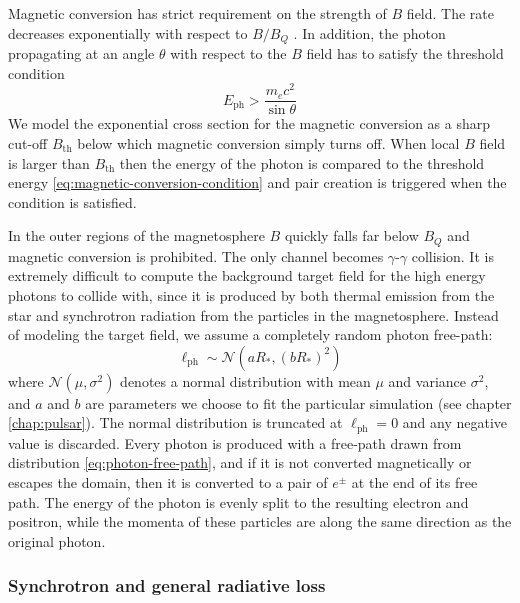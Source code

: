 Magnetic conversion has strict requirement on the strength of $B$ field. The
rate decreases exponentially with respect to $B/B_{Q}$
\citep{erber_high-energy_1966}. In addition, the photon propagating at an angle
$\theta$ with respect to the $B$ field has to satisfy the threshold condition
\begin{equation}
  \label{eq:magnetic-conversion-condition}
  E_\mathrm{ph} > \frac{m_{e}c^2}{\sin\theta}
\end{equation}
We model the exponential cross section for the magnetic conversion as a sharp
cut-off $B_\mathrm{th}$ below which magnetic conversion simply turns off. When
local $B$ field is larger than $B_\mathrm{th}$ then the energy of the photon is
compared to the threshold energy \eqref{eq:magnetic-conversion-condition} and
pair creation is triggered when the condition is satisfied.

In the outer regions of the magnetosphere $B$ quickly falls far below $B_{Q}$
and magnetic conversion is prohibited. The only channel becomes
$\gamma$-$\gamma$ collision. It is extremely difficult to compute the background
target field for the high energy photons to collide with, since it is produced
by both thermal emission from the star and synchrotron radiation from the
particles in the magnetosphere. Instead of modeling the target field, we assume
a completely random photon free-path:
\begin{equation}
  \label{eq:photon-free-path}
  \ell_\mathrm{ph} \sim \mathcal{N}(aR_{*}, (bR_{*})^2)
\end{equation}
where $\mathcal{N}(\mu, \sigma^2)$ denotes a normal distribution with mean $\mu$
and variance $\sigma^2$, and $a$ and $b$ are parameters we choose to fit the
particular simulation (see chapter \ref{chap:pulsar}). The normal distribution
is truncated at $\ell_\mathrm{ph} = 0$ and any negative value is discarded.
Every photon is produced with a free-path drawn from distribution
\ref{eq:photon-free-path}, and if it is not converted magnetically or escapes
the domain, then it is converted to a pair of $e^{\pm}$ at the end of its free
path. The energy of the photon is evenly split to the resulting electron and
positron, while the momenta of these particles are along the same direction as
the original photon.

\subsubsection{Synchrotron and general radiative loss}
\label{sec:synchrotron-loss}


